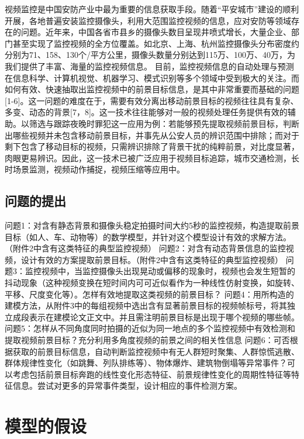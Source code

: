 \documentclass[bwprint]{gmcmthesis}
\begin{document}
视频监控是中国安防产业中最为重要的信息获取手段。随着“平安城市”建设的顺利开展，各地普遍安装监控摄像头，利用大范围监控视频的信息，应对安防等领域存在的问题。近年来，中国各省市县乡的摄像头数目呈现井喷式增长，大量企业、部门甚至实现了监控视频的全方位覆盖。如北京、上海、杭州监控摄像头分布密度约分别为71、158、130个/平方公里，摄像头数量分别达到115万、100万、40万，为我们提供了丰富、海量的监控视频信息。
目前，监控视频信息的自动处理与预测在信息科学、计算机视觉、机器学习、模式识别等多个领域中受到极大的关注。而如何有效、快速抽取出监控视频中的前景目标信息，是其中非常重要而基础的问题[1-6]。这一问题的难度在于，需要有效分离出移动前景目标的视频往往具有复杂、多变、动态的背景[7，8]。这一技术往往能够对一般的视频处理任务提供有效的辅助。以筛选与跟踪夜晚时罪犯这一应用为例：若能够预先提取视频前景目标，判断出哪些视频并未包含移动前景目标，并事先从公安人员的辨识范围中排除；而对于剩下包含了移动目标的视频，只需辨识排除了背景干扰的纯粹前景，对比度显著，肉眼更易辨识。因此，这一技术已被广泛应用于视频目标追踪，城市交通检测，长时场景监测，视频动作捕捉，视频压缩等应用中。


\subsection{问题的提出}

问题1：对含有静态背景和摄像头稳定拍摄时间大约5秒的监控视频，构造提取前景目标（如人、车、动物等）的数学模型，并针对这个模型设计有效的求解方法。（附件2中含有这类特征的典型监控视频） 
问题2：对含有动态背景信息的监控视频，设计有效的方案提取前景目标。（附件2中含有这类特征的典型监控视频）
问题3：监控视频中，当监控摄像头出现晃动或偏移的现象时，视频也会发生短暂的抖动现象（这种视频变换在短时间内可可近似看作为一种线性仿射变换，如旋转、平移、尺度变化等）。怎样有效地提取这类视频的前景目标？ 
问题4：用所构造的建模方法，从附件3中的每组视频中选出含有显著前景目标的视频帧标号，将其独立成段表示在建模论文正文中。并且需注明前景目标是出现于哪个视频的哪些帧。
问题5：怎样从不同角度同时拍摄的近似为同一地点的多个监控视频中有效检测和提取视频前景目标？充分利用多角度视频的前景之间的相关性信息
问题6：可否根据获取的前景目标信息，自动判断监控视频中有无人群短时聚集、人群惊慌逃散、群体规律性变化（如跳舞、列队排练等）、物体爆炸、建筑物倒塌等异常事件？可以考虑包括前景目标奔跑的线性变化形态特征、前景规律性变化的周期性特征等特征信息。尝试对更多的异常事件类型，设计相应的事件检测方案。


\section{模型的假设}
\end{document}
